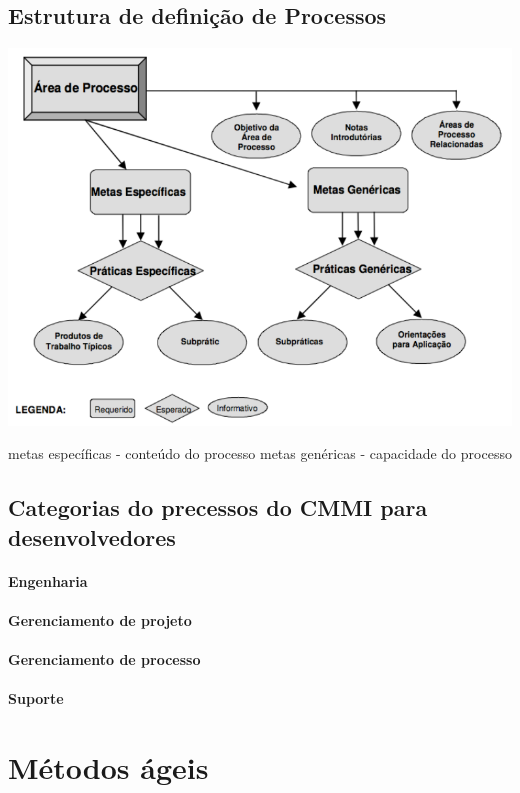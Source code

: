 \documentclass{article}
\begin{document}
\subsection{Estrutura de definição de Processos}
	\begin{center}
		\includegraphics[scale=0.5]{estrutura_definicao_cmmi}
	\end{center}
	metas específicas - conteúdo do processo
	metas genéricas - capacidade do processo

\subsection{Categorias do precessos do CMMI para desenvolvedores}

\paragraph{Engenharia}
\paragraph{Gerenciamento de projeto}
\paragraph{Gerenciamento de processo}
\paragraph{Suporte}

\section{Métodos ágeis} \date{7 de Abril de 2014}
\end{document}
